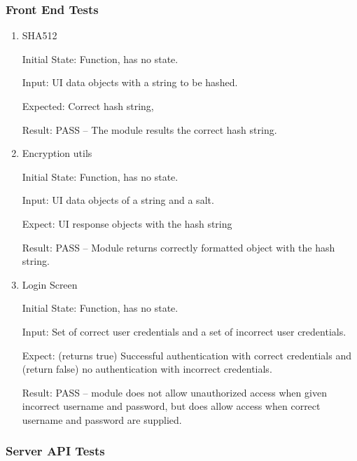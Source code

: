 \documentclass[12pt, titlepage]{article}
\begin{document}
  \subsubsection{Front End Tests}
    \begin{enumerate}

      \item{SHA512\\} \label{sha}

      Initial State: Function, has no state.

      Input: UI data objects with a string to be hashed.

			Expected: Correct hash string,

			Result: PASS -- The module results the correct hash string.

      \item{Encryption utils\\} \label{utils}

      Initial State: Function, has no state.

      Input: UI data objects of a string and a salt.

      Expect: UI response objects with the hash string

      Result: PASS -- Module returns correctly formatted object with the hash string.

      \item{Login Screen\\} \label{login}

      Initial State: Function, has no state.

      Input: Set of correct user credentials and a set of incorrect user credentials.

			Expect: (returns true) Successful authentication with correct credentials
				and (return false) no authentication with incorrect credentials.
                
			Result: PASS -- module does not allow unauthorized access when given
				incorrect username and password, but does allow access when correct username
				and password are supplied.
                
    \end{enumerate}

  \subsubsection{Server API Tests}
\end{document}
